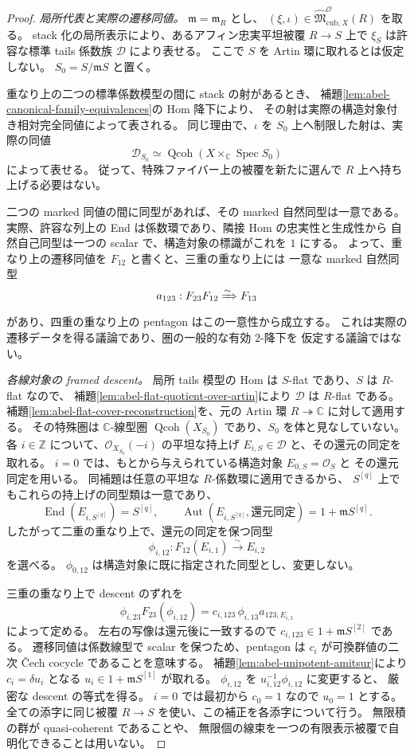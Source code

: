 \begin{proof}
\emph{局所代表と実際の遷移同値。}
$\mathfrak m=\mathfrak m_R$ とし、
$(\xi,\iota)\in\widehat{\mathfrak M}^{\mathcal O}_{\mathrm{cub},X}(R)$ を取る。
stack 化の局所表示により、あるアフィン忠実平坦被覆 $R\to S$ 上で
$\xi_S$ は許容な標準 tails 係数族 $\mathcal D$ により表せる。
ここで $S$ を Artin 環に取れるとは仮定しない。
$S_0=S/\mathfrak mS$ と置く。

重なり上の二つの標準係数模型の間に stack の射があるとき、
補題\ref{lem:abel-canonical-family-equivalences}の Hom 降下により、
その射は実際の構造対象付き相対完全同値によって表される。
同じ理由で、$\iota$ を $S_0$ 上へ制限した射は、実際の同値
\[
 \mathcal D_{S_0}\simeq
 \operatorname{Qcoh}(X\times_{\mathbb C}\operatorname{Spec}S_0)
\]
によって表せる。
従って、特殊ファイバー上の被覆を新たに選んで $R$ 上へ持ち上げる必要はない。

二つの marked 同値の間に同型があれば、その marked 自然同型は一意である。
実際、許容な列上の End は係数環であり、隣接 Hom の忠実性と生成性から
自然自己同型は一つの scalar で、構造対象の標識がこれを $1$ にする。
よって、重なり上の遷移同値を $F_{12}$ と書くと、三重の重なり上には
一意な marked 自然同型
\[
 a_{123}:F_{23}F_{12}\xRightarrow{\sim}F_{13}
\]
があり、四重の重なり上の pentagon はこの一意性から成立する。
これは実際の遷移データを得る議論であり、圏の一般的な有効 $2$-降下を
仮定する議論ではない。

\emph{各線対象の framed descent。}
局所 tails 模型の Hom は $S$-flat であり、$S$ は $R$-flat なので、
補題\ref{lem:abel-flat-quotient-over-artin}により $\mathcal D$ は $R$-flat である。
補題\ref{lem:abel-flat-cover-reconstruction}を、元の Artin 環
$R\twoheadrightarrow\mathbb C$ に対して適用する。
その特殊圏は $\mathbb C$-線型圏
$\operatorname{Qcoh}(X_{S_0})$ であり、$S_0$ を体と見なしていない。
各 $i\in\mathbb Z$ について、$\mathcal O_{X_{S_0}}(-i)$ の平坦な持上げ
$E_{i,S}\in\mathcal D$ と、その還元の同定を取れる。
$i=0$ では、もとから与えられている構造対象 $E_{0,S}=\mathcal O_S$ と
その還元同定を用いる。
同補題は任意の平坦な $R$-係数環に適用できるから、
$S^{[q]}$ 上でもこれらの持上げの同型類は一意であり、
\[
 \operatorname{End}(E_{i,S^{[q]}})=S^{[q]},\qquad
 \operatorname{Aut}(E_{i,S^{[q]}},\text{還元同定})
       =1+\mathfrak mS^{[q]}.
\]
したがって二重の重なり上で、還元の同定を保つ同型
\[
 \phi_{i,12}:F_{12}(E_{i,1})\xrightarrow{\sim}E_{i,2}
\]
を選べる。
$\phi_{0,12}$ は構造対象に既に指定された同型とし、変更しない。

三重の重なり上で descent のずれを
\[
 \phi_{i,23}F_{23}(\phi_{i,12})
 =c_{i,123}\,\phi_{i,13}a_{123,E_{i,1}}
\]
によって定める。
左右の写像は還元後に一致するので
$c_{i,123}\in1+\mathfrak mS^{[2]}$ である。
遷移同値は係数線型で scalar を保つため、pentagon は
$c_i$ が可換群値の二次 \v{C}ech cocycle であることを意味する。
補題\ref{lem:abel-unipotent-amitsur}により
$c_i=\delta u_i$ となる $u_i\in1+\mathfrak mS^{[1]}$ が取れる。
$\phi_{i,12}$ を $u_{i,12}^{-1}\phi_{i,12}$ に変更すると、
厳密な descent の等式を得る。
$i=0$ では最初から $c_0=1$ なので $u_0=1$ とする。
全ての添字に同じ被覆 $R\to S$ を使い、この補正を各添字について行う。
無限積の群が quasi-coherent であることや、
無限個の線束を一つの有限表示被覆で自明化できることは用いない。


\end{proof}
